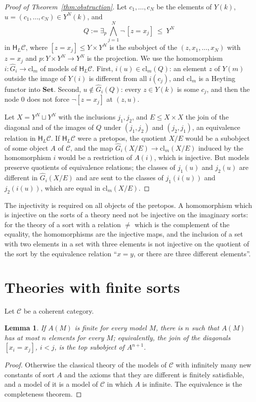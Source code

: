 \documentclass[11pt]{amsart}
\newtheorem{lem}[thm]{Lemma}
\theoremstyle{definition}
\newcommand{\Set}{\mathbf{Set}}
\newcommand{\HH}{\mathsf H}
\newcommand{\cC}{\mathcal C}
\newcommand{\cl}{\mathrm{cl}}
\begin{document}
\begin{proof}[Proof of Theorem~\ref{thm:obstruction}]
Let $c_1,\dots,c_N$ be the elements of $Y(k)$, $u=(c_1,\dots,c_N)\in
Y^N(k)$, and
\[
Q:=\exists_p\bigwedge_{j=1}^N\neg\,[z=x_j]\ \le\ Y^N
\]
in $\HH_L\cC$, where $[z=x_j]\le Y\times Y^N$ is the subobject of the
$(z,x_1,\dots,x_N)$ with $z=x_j$ and $p\colon Y\times Y^N\to Y^N$ is
the projection. We use the homomorphism $i\colon\hat G_i\to\cl_m$ of
models of $\HH_L\cC$. First, $i(u)\in\cl_m(Q)$: an element $z$ of
$Y(m)$ outside the image of $Y(i)$ is different from all $i(c_j)$, and
$\cl_m$ is a Heyting functor into $\Set$. Second, $u\notin\hat G_i(Q)$:
every $z\in Y(k)$ is some $c_j$, and then the node $0$ does not force
$\neg[z=x_j]$ at $(z,u)$.

Let $X=Y^N\sqcup Y^N$ with the inclusions $j_1,j_2$, and $E\le X\times
X$ the join of the diagonal and of the images of $Q$ under $(j_1,j_2)$
and $(j_2,j_1)$, an equivalence relation in $\HH_L\cC$. If $\HH_L\cC$
were a pretopos, the quotient $X/E$ would be a subobject of some
object $A$ of $\cC$, and the map $\hat G_i(X/E)\to\cl_m(X/E)$ induced
by the homomorphism $i$ would be a restriction of $A(i)$, which is
injective. But models preserve quotients of equivalence relations; the
classes of $j_1(u)$ and $j_2(u)$ are different in $\hat G_i(X/E)$ and
are sent to the classes of $j_1(i(u))$ and $j_2(i(u))$, which are
equal in $\cl_m(X/E)$.
\end{proof}

The injectivity is required on all objects of the pretopos. A
homomorphism which is injective on the sorts of a theory need not be
injective on the imaginary sorts: for the theory of a sort with a
relation $\ne$ which is the complement of the equality, the
homomorphisms are the injective maps, and the inclusion of a set with
two elements in a set with three elements is not injective on the
quotient of the sort by the equivalence relation ``$x=y$, or there
are three different elements''.

\section{Theories with finite sorts}\label{sec:finite}

Let $\cC$ be a coherent category.

\begin{lem}\label{lem:bounded}
If $A(M)$ is finite for every model $M$, there is $n$ such that $A(M)$
has at most $n$ elements for every $M$; equivalently, the join of the
diagonals $[x_i=x_j]$, $i<j$, is the top subobject of $A^{n+1}$.
\end{lem}
\begin{proof}
Otherwise the classical theory of the models of $\cC$ with infinitely
many new constants of sort $A$ and the axioms that they are different
is finitely satisfiable, and a model of it is a model of $\cC$ in
which $A$ is infinite. The equivalence is the completeness theorem.
\end{proof}
\end{document}
